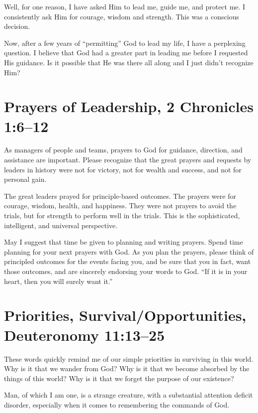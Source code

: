 \documentclass[12pt]{memoir}
\begin{document}
Well, for one reason, I have asked Him to lead me, guide me, and protect me. I consistently ask Him for courage, wisdom and strength. This was a conscious decision.

Now, after a few years of ``permitting'' God to lead my life, I have a perplexing question. I believe that God had a greater part in leading me before I requested His guidance. Is it possible that He was there all along and I just didn't recognize Him? 

\section[Prayers of Leadership]{Prayers of Leadership, 2 Chronicles 1:6--12}
 

As managers of people and teams, prayers to God for guidance, direction, and assistance are important. Please recognize that the great prayers and requests by leaders in history were not for victory, not for wealth and success, and not for personal gain.

The great leaders prayed for principle-based outcomes. The prayers were for courage, wisdom, health, and happiness. They were not prayers to avoid the trials, but for strength to perform well in the trials. This is the sophisticated, intelligent, and universal perspective.

May I suggest that time be given to planning and writing prayers.
Spend time planning for your next prayers with God. As you plan the
prayers, please think of principled outcomes for the events facing
you, and be sure that you in fact, want those outcomes, and are sincerely
endorsing your words to God. ``If it is in your heart, then you will
surely want it.'' 

\section[Priorities, Survival\slash{}Opportunities]{Priorities, Survival\slash{}Opportunities, Deuteronomy 11:13--25}

These words quickly remind me of our simple priorities in surviving
in this world. Why is it that we wander from God? Why is it that we
become absorbed by the things of this world? Why is it that we forget
the purpose of our existence?

Man, of which I am one, is a strange creature, with a substantial
attention deficit disorder, especially when it comes to remembering
the commands of God. 
\end{document}
